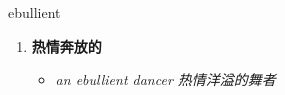 
\begin{frame}
{\huge ebullient}
\begin{center}
\begin{enumerate}\Large
  \item \textbf{热情奔放的}
  \begin{itemize}
    \item \em{\Large{an ebullient dancer 热情洋溢的舞者}}
  \end{itemize}
\end{enumerate}
\end{center}
\end{frame}
